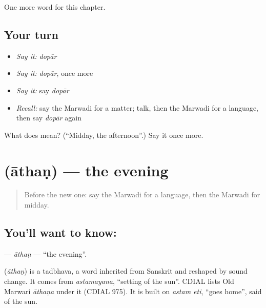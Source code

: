 \begin{grammarlens}[title={What you've built}]
One more word for this chapter.
\end{grammarlens}

\subsection*{Your turn}
\begin{itemize}
\raggedright
  \item \emph{Say it:} \emph{dopār}
  \item \emph{Say it:} \emph{dopār}, once more
  \item \emph{Say it:} say \emph{dopār}
  \item \emph{Recall:} say the Marwadi for a matter; talk, then the Marwadi for a language, then say \emph{dopār} again
\end{itemize}

\begin{tcolorbox}[breakable,colback=teal!4,colframe=teal!35!black,title={Before you move on}]
What does  mean? (\textquotedblleft{}Midday, the afternoon\textquotedblright{}.) Say it once more.
\end{tcolorbox}
\section[\texorpdfstring{\mw{आथण} (āthaṇ)}{आथण (āthaṇ)}]{ (āthaṇ) — the evening}

\label{lesson:MW-C90-athan}



\begin{quote}
Before the new one: say the Marwadi for a language, then the Marwadi for midday.
\end{quote}

\subsection*{You'll want to know: }
\textbf{} — \emph{āthaṇ} — \textquotedblleft{}the evening\textquotedblright{}.

\begin{cousinweb}
\textbf{} (\emph{āthaṇ}) is a tadbhava, a word inherited from Sanskrit and reshaped by sound change. It comes from \emph{astamayana}, \textquotedblleft{}setting of the sun\textquotedblright{}. CDIAL lists Old Marwari \emph{āthaṇa} under it (CDIAL 975). It is built on \emph{astam eti}, \textquotedblleft{}goes home\textquotedblright{}, said of the sun.
\end{cousinweb}

